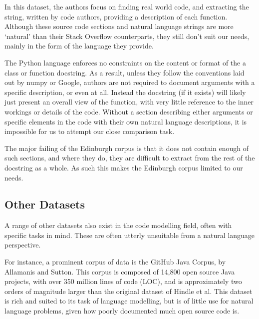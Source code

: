 In this dataset, the authors focus on finding real world code, and extracting the string, written by code authors, providing a description of each function.
Although these source code sections and natural language strings are more `natural' than their Stack Overflow counterparts, they still don't suit our needs, mainly in the form of the language they provide. 

The Python language enforces no constraints on the content or format of the a class or function docstring.
As a result, unless they follow the conventions laid out by numpy or Google, authors are not required to document arguments with a specific description, or even at all.
Instead the docstring (if it exists) will likely just present an overall view of the function, with very little reference to the inner workings or details of the code. 
Without a section describing either arguments or specific elements in the code with their own natural language descriptions, it is impossible for us to attempt our close comparison task.



The major failing of the Edinburgh corpus is that it does not contain enough of such sections, and where they do, they are difficult to extract from the rest of the docstring as a whole.
As such this makes the Edinburgh corpus limited to our needs.


\subsection{Other Datasets}
A range of other datasets also exist in the code modelling field, often with specific tasks in mind. These are often utterly unsuitable from a natural language perspective.

For instance, a prominent corpus of data is the GitHub Java Corpus, by Allamanis and Sutton\cite{allamanis_mining_2013}. This corpus is composed of 14,800 open source Java projects, with over 350 million lines of code (LOC), and is approximately two orders of magnitude larger than the original dataset of Hindle et al. This dataset is rich and suited to its task of language modelling, but is of little use for natural language problems, given how poorly documented much open source code is.

